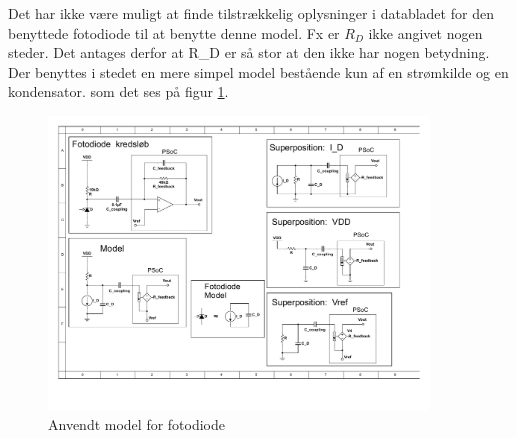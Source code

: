 \documentclass[HardwareDesign/HardwareDesign_main.tex]{subfiles}
\begin{document}
Det har ikke være muligt at finde tilstrækkelig oplysninger i databladet\autocite{SFH203FA} for den benyttede fotodiode til at benytte denne model. Fx er $R_D$ ikke angivet nogen steder. Det antages derfor at R\_D er så stor at den ikke har nogen betydning. Der benyttes i stedet en mere simpel model bestående kun af en strømkilde og en kondensator. som det ses på figur \ref{fig:photodiodeModelSimple}.

\begin{figure}[H]
    \centering
    \includegraphics[width=0.9\textwidth,trim={4.1in 2.1in 4.75in 4.7in},clip, page=1]{HardwareDesign/CupSensor/graphics/Superposition.pdf}
    \caption{Anvendt model for fotodiode}
    \label{fig:photodiodeModelSimple}
\end{figure}
\end{document}
